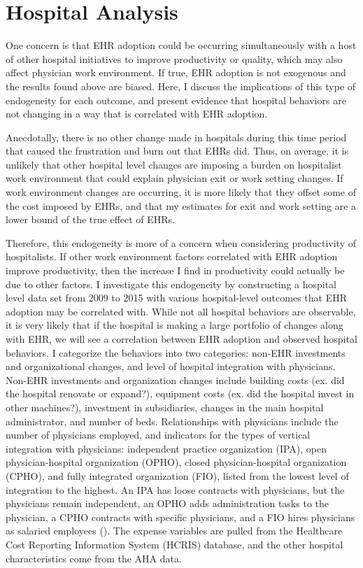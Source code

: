 \documentclass[12pt]{article}
\begin{document}
\section{Hospital Analysis}\label{sec:hospanalysis}

One concern is that EHR adoption could be occurring simultaneously with a host of other hospital initiatives to improve productivity or quality, which may also affect physician work environment. If true, EHR adoption is not exogenous and the results found above are biased. Here, I discuss the implications of this type of endogeneity for each outcome, and present evidence that hospital behaviors are not changing in a way that is correlated with EHR adoption.

Anecdotally, there is no other change made in hospitals during this time period that caused the frustration and burn out that EHRs did. Thus, on average, it is unlikely that other hospital level changes are imposing a burden on hospitalist work environment that could explain physician exit or work setting changes. If work environment changes are occurring, it is more likely that they offset some of the cost imposed by EHRs, and that my estimates for exit and work setting are a lower bound of the true effect of EHRs. 

Therefore, this endogeneity is more of a concern when considering productivity of hospitalists. If other work environment factors correlated with EHR adoption improve productivity, then the increase I find in productivity could actually be due to other factors. I investigate this endogeneity by constructing a hospital level data set from 2009 to 2015 with various hospital-level outcomes that EHR adoption may be correlated with. While not all hospital behaviors are observable, it is very likely that if the hospital is making a large portfolio of changes along with EHR, we will see a correlation between EHR adoption and observed hospital behaviors. I categorize the behaviors into two categories: non-EHR investments and organizational changes, and level of hospital integration with physicians. Non-EHR investments and organization changes include building costs (ex. did the hospital renovate or expand?), equipment costs (ex. did the hospital invest in other machines?), investment in subsidiaries, changes in the main hospital administrator, and number of beds. Relationships with physicians include the number of physicians employed, and indicators for the types of vertical integration with physicians: independent practice organization (IPA), open physician-hospital organization (OPHO), closed physician-hospital organization (CPHO), and fully integrated organization (FIO), listed from the lowest level of integration to the highest. An IPA has loose contracts with physicians, but the physicians remain independent, an OPHO adds administration tasks to the physician, a CPHO contracts with specific physicians, and a FIO hires physicians as salaried employees (\cite{short2017integration}). The expense variables are pulled from the Healthcare Cost Reporting Information System (HCRIS) database, and the other hospital characteristics come from the AHA data.
\end{document}
